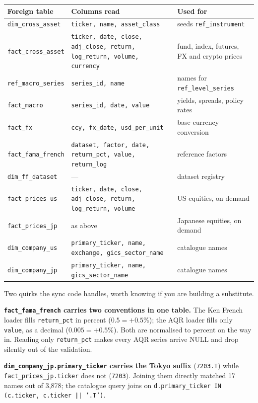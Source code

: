 \documentclass[11pt,a4paper]{article}
\newcommand{\code}[1]{\texttt{\small #1}}
\begin{document}
\begin{table}[htbp]
\centering\small
\begin{tabularx}{\textwidth}{@{}lXl@{}}
\toprule
\textbf{Foreign table} & \textbf{Columns read} & \textbf{Used for} \\
\midrule
\code{dim\_cross\_asset} & \code{ticker, name, asset\_class} & seeds \code{ref\_instrument} \\
\code{fact\_cross\_asset} & \code{ticker, date, close, adj\_close, return, log\_return, volume, currency} & fund, index, futures, FX and crypto prices \\
\code{ref\_macro\_series} & \code{series\_id, name} & names for \code{ref\_level\_series} \\
\code{fact\_macro} & \code{series\_id, date, value} & yields, spreads, policy rates \\
\code{fact\_fx} & \code{ccy, fx\_date, usd\_per\_unit} & base-currency conversion \\
\code{fact\_fama\_french} & \code{dataset, factor, date, return\_pct, value, return\_log} & reference factors \\
\code{dim\_ff\_dataset} & --- & dataset registry \\
\code{fact\_prices\_us} & \code{ticker, date, close, adj\_close, return, log\_return, volume} & US equities, on demand \\
\code{fact\_prices\_jp} & as above & Japanese equities, on demand \\
\code{dim\_company\_us} & \code{primary\_ticker, name, exchange, gics\_sector\_name} & catalogue names \\
\code{dim\_company\_jp} & \code{primary\_ticker, name, gics\_sector\_name} & catalogue names \\
\bottomrule
\end{tabularx}
\end{table}

Two quirks the sync code handles, worth knowing if you are building a substitute.

\textbf{\code{fact\_fama\_french} carries two conventions in one table.} The Ken
French loader fills \code{return\_pct} in percent ($0.5 = +0.5\%$); the AQR loader
fills only \code{value}, as a decimal ($0.005 = +0.5\%$). Both are normalised to
percent on the way in. Reading only \code{return\_pct} makes every AQR series
arrive NULL and drop silently out of the validation.

\textbf{\code{dim\_company\_jp.primary\_ticker} carries the Tokyo suffix}
(\code{7203.T}) while \code{fact\_prices\_jp.ticker} does not (\code{7203}).
Joining them directly matched 17 names out of 3{,}878; the catalogue query joins on
\code{d.primary\_ticker IN (c.ticker, c.ticker || '.T')}.
\end{document}
